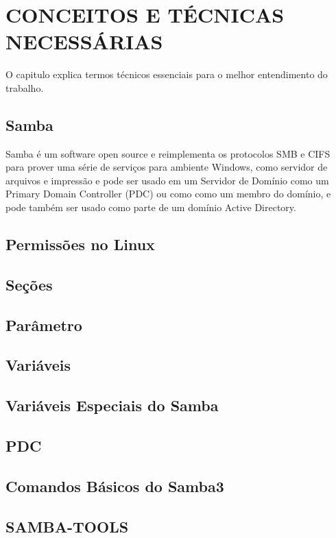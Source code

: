 \chapter{CONCEITOS E TÉCNICAS NECESSÁRIAS}

O capitulo explica termos técnicos essenciais para o melhor entendimento do trabalho.

\section{Samba}

Samba é um software open source e reimplementa os protocolos SMB e CIFS para prover uma série de serviços para ambiente Windows, como servidor de arquivos e impressão e pode ser usado em um Servidor de Domínio como um Primary Domain Controller (PDC) ou como como um membro do domínio, e pode também ser usado como parte de um domínio Active Directory.

\section{Permissões no Linux}

\section{Seções}

\section{Parâmetro}

\section{Variáveis}

\section{Variáveis Especiais do Samba}

\section{PDC}

\section{Comandos Básicos do Samba3}

\section{SAMBA-TOOLS}

